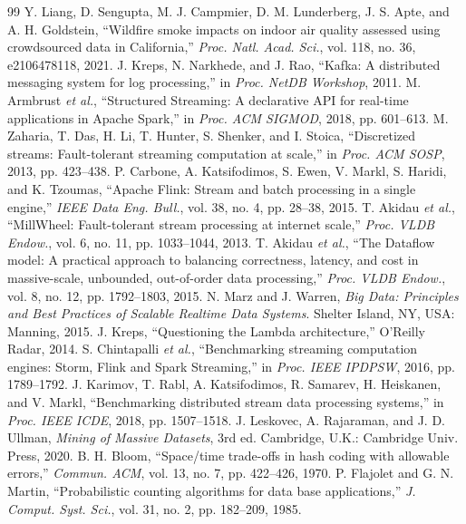 \documentclass[10pt,journal,compsoc]{IEEEtran}
\begin{document}
\begin{thebibliography}{99}
 Y. Liang, D. Sengupta, M. J. Campmier, D. M. Lunderberg, J. S. Apte, and A. H. Goldstein, ``Wildfire smoke impacts on indoor air quality assessed using crowdsourced data in California,'' \emph{Proc. Natl. Acad. Sci.}, vol. 118, no. 36, e2106478118, 2021.
 J. Kreps, N. Narkhede, and J. Rao, ``Kafka: A distributed messaging system for log processing,'' in \emph{Proc. NetDB Workshop}, 2011.
 M. Armbrust \emph{et al.}, ``Structured Streaming: A declarative API for real-time applications in Apache Spark,'' in \emph{Proc. ACM SIGMOD}, 2018, pp. 601--613.
 M. Zaharia, T. Das, H. Li, T. Hunter, S. Shenker, and I. Stoica, ``Discretized streams: Fault-tolerant streaming computation at scale,'' in \emph{Proc. ACM SOSP}, 2013, pp. 423--438.
 P. Carbone, A. Katsifodimos, S. Ewen, V. Markl, S. Haridi, and K. Tzoumas, ``Apache Flink: Stream and batch processing in a single engine,'' \emph{IEEE Data Eng. Bull.}, vol. 38, no. 4, pp. 28--38, 2015.
 T. Akidau \emph{et al.}, ``MillWheel: Fault-tolerant stream processing at internet scale,'' \emph{Proc. VLDB Endow.}, vol. 6, no. 11, pp. 1033--1044, 2013.
 T. Akidau \emph{et al.}, ``The Dataflow model: A practical approach to balancing correctness, latency, and cost in massive-scale, unbounded, out-of-order data processing,'' \emph{Proc. VLDB Endow.}, vol. 8, no. 12, pp. 1792--1803, 2015.
 N. Marz and J. Warren, \emph{Big Data: Principles and Best Practices of Scalable Realtime Data Systems}. Shelter Island, NY, USA: Manning, 2015.
 J. Kreps, ``Questioning the Lambda architecture,'' O'Reilly Radar, 2014.
 S. Chintapalli \emph{et al.}, ``Benchmarking streaming computation engines: Storm, Flink and Spark Streaming,'' in \emph{Proc. IEEE IPDPSW}, 2016, pp. 1789--1792.
 J. Karimov, T. Rabl, A. Katsifodimos, R. Samarev, H. Heiskanen, and V. Markl, ``Benchmarking distributed stream data processing systems,'' in \emph{Proc. IEEE ICDE}, 2018, pp. 1507--1518.
 J. Leskovec, A. Rajaraman, and J. D. Ullman, \emph{Mining of Massive Datasets}, 3rd ed. Cambridge, U.K.: Cambridge Univ. Press, 2020.
 B. H. Bloom, ``Space/time trade-offs in hash coding with allowable errors,'' \emph{Commun. ACM}, vol. 13, no. 7, pp. 422--426, 1970.
 P. Flajolet and G. N. Martin, ``Probabilistic counting algorithms for data base applications,'' \emph{J. Comput. Syst. Sci.}, vol. 31, no. 2, pp. 182--209, 1985.

\end{thebibliography}
\end{document}
